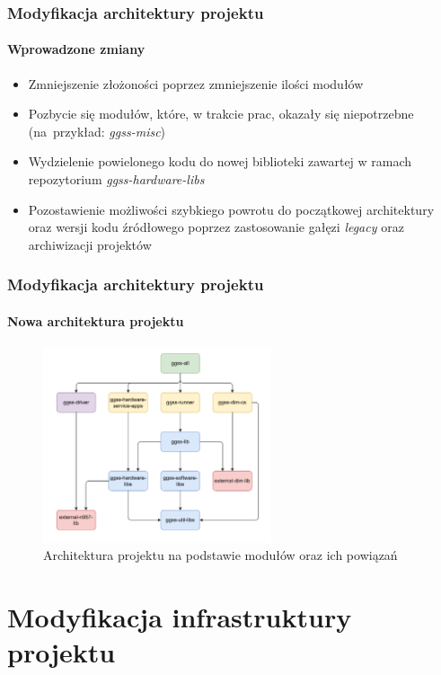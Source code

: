 \documentclass[10pt]{beamer}
\begin{document}
\begin{frame}
    \frametitle{Modyfikacja architektury projektu}
    \framesubtitle{Wprowadzone zmiany}
    \begin{itemize}
        \item Zmniejszenie złożoności poprzez zmniejszenie ilości modułów
        \item Pozbycie się modułów, które, w trakcie prac, okazały się niepotrzebne (na~przykład: \emph{ggss-misc})
        \item Wydzielenie powielonego kodu do nowej biblioteki zawartej w ramach repozytorium \emph{ggss-hardware-libs}
        \item Pozostawienie możliwości szybkiego powrotu do początkowej architektury oraz wersji kodu źródłowego poprzez zastosowanie gałęzi \emph{legacy} oraz archiwizacji projektów
    \end{itemize}
\end{frame}

\begin{frame}
\frametitle{Modyfikacja architektury projektu}
\framesubtitle{Nowa architektura projektu}
\begin{figure}
    \includegraphics[width=0.6\textwidth]{static/new_architecture.pdf}
    \caption{Architektura projektu na podstawie modułów oraz ich powiązań}
\end{figure}
\end{frame}


\section{Modyfikacja infrastruktury projektu}
\end{document}
